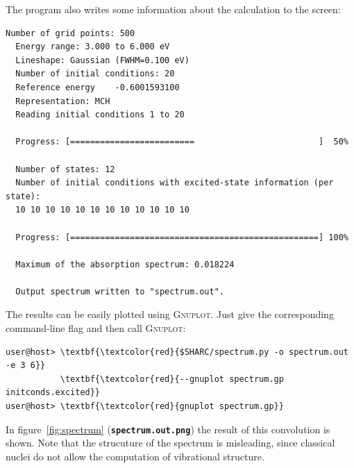 \documentclass[a4paper,11pt,DIV=15,openany]{scrbook}
\newcommand{\ttt}[1]{\textbf{\texttt{#1}}}
\begin{document}
The program also writes some information about the calculation to the screen:
\begin{oframed}
\footnotesize\begin{Verbatim}[commandchars=\\\{\}]
  Number of grid points: 500
  Energy range: 3.000 to 6.000 eV
  Lineshape: Gaussian (FWHM=0.100 eV)
  Number of initial conditions: 20
  Reference energy    -0.6001593100
  Representation: MCH
  Reading initial conditions 1 to 20
  
  Progress: [=========================                         ]  50%
  
  Number of states: 12
  Number of initial conditions with excited-state information (per state):
  10 10 10 10 10 10 10 10 10 10 10 10 
  
  Progress: [==================================================] 100%
  
  Maximum of the absorption spectrum: 0.018224
  
  Output spectrum written to "spectrum.out".
\end{Verbatim}
\end{oframed}

\normalsize
The results can be easily plotted using \textsc{Gnuplot}. Just give the corresponding command-line flag and then call \textsc{Gnuplot}:
\begin{Verbatim}[commandchars=\\\{\}]
user@host> \textbf{\textcolor{red}{$SHARC/spectrum.py -o spectrum.out -e 3 6}}
           \textbf{\textcolor{red}{--gnuplot spectrum.gp initconds.excited}}
user@host> \textbf{\textcolor{red}{gnuplot spectrum.gp}}
\end{Verbatim}

In figure~\ref{fig:spectrum} (\ttt{spectrum.out.png}) the result of this convolution is shown.
Note that the strucuture of the spectrum is misleading, since classical nuclei do not allow the computation of vibrational structure.
\end{document}
